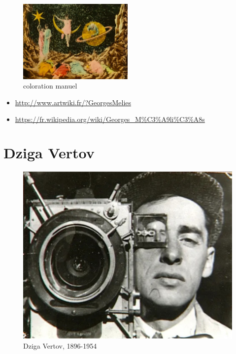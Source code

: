 \documentclass[
  french,
]{book}
\providecommand{\tightlist}{%
  \setlength{\itemsep}{0pt}\setlength{\parskip}{0pt}}
\begin{document}
\begin{figure}
\centering
\includegraphics[width=0.5\textwidth,height=\textheight]{medias/corpus/melies/b25.gif}
\caption{coloration manuel}
\end{figure}

\begin{itemize}
\tightlist
\item
  \url{http://www.artwiki.fr/?GeorgesMelies}
\item
  \url{https://fr.wikipedia.org/wiki/Georges_M\%C3\%A9li\%C3\%A8s}
\end{itemize}

\hypertarget{dziga-vertov}{%
\section{Dziga Vertov}\label{dziga-vertov}}

\begin{figure}
\centering
\includegraphics{medias/corpus/vertov/Dziga-Vertov.jpg}
\caption{Dziga Vertov, 1896-1954}
\end{figure}
\end{document}
